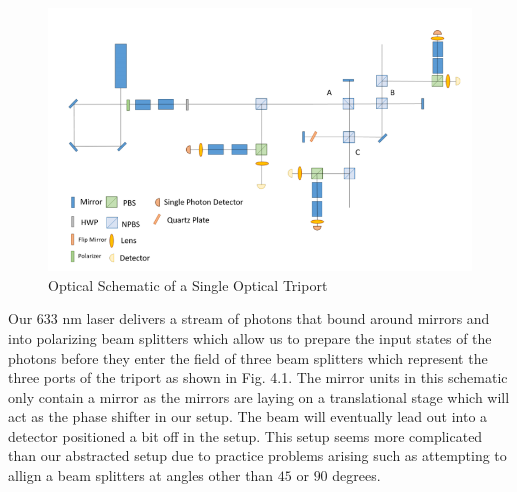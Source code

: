 \begin{figure}[H]
    \centering
    \includegraphics[scale=0.8]{2_Body/Figures/updated_setup.png}
    \caption{Optical Schematic of a Single Optical Triport}
    \label{fig:my_label}
\end{figure}
Our 633 nm laser delivers a stream of photons that bound around mirrors and into polarizing beam splitters which allow us to prepare the input states of the photons before they enter the field of three beam splitters which represent the three ports of the triport as shown in Fig. 4.1. The mirror units in this schematic only contain a mirror as the mirrors are laying on a translational stage which will act as the phase shifter in our setup. The beam will eventually lead out into a detector positioned a bit off in the setup. This setup seems more complicated than our abstracted setup due to practice problems arising such as attempting to allign a beam splitters at angles other than $45$ or $90$ degrees.

